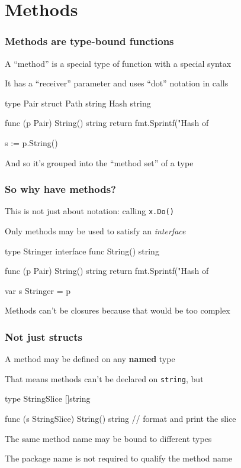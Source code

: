 \documentclass[handout,compress,t,11pt]{beamer}
\begin{document}

\section{Methods}
\begin{frame}[fragile]
    \frametitle{Methods are type-bound functions}
    A ``method'' is a special type of function with a special syntax \par
    \vspace{0.4\baselineskip}
    It has a ``receiver'' parameter and uses ``dot'' notation in calls
\begin{golang}
type Pair struct {
    Path string
    Hash string
}

func (p Pair) String() string {
    return fmt.Sprintf("Hash of %
}

s := p.String()
\end{golang}
    \vspace{0.4\baselineskip}
    And so it's grouped into the ``method set'' of a type
\end{frame}

\begin{frame}[fragile]
    \frametitle{So why have methods?}
    This is not just about notation: calling \verb|x.Do()| \par
    \vspace{0.4\baselineskip}
    Only methods may be used to satisfy an {\em interface}
    \vspace{\baselineskip}
\begin{golang}
type Stringer interface {
    func String() string
}

func (p Pair) String() string {
    return fmt.Sprintf("Hash of %
}

var s Stringer = p
\end{golang}
    \vspace{\baselineskip}
    Methods can't be closures because that would be too complex
\end{frame}

\begin{frame}[fragile]
    \frametitle{Not just structs}
    A method may be defined on any {\bf named} type \par
    \vspace{0.4\baselineskip}
    That means methods can't be declared on \verb|string|, but
    \vspace{\baselineskip}
\begin{golang}
type StringSlice []string

func (s StringSlice) String() string {
    // format and print the slice
}
\end{golang}
    \vspace{\baselineskip}
    The same method name may be bound to different types \par
    \vspace{\baselineskip}
    The package name is not required to qualify the method name
\end{frame}
\end{document}
